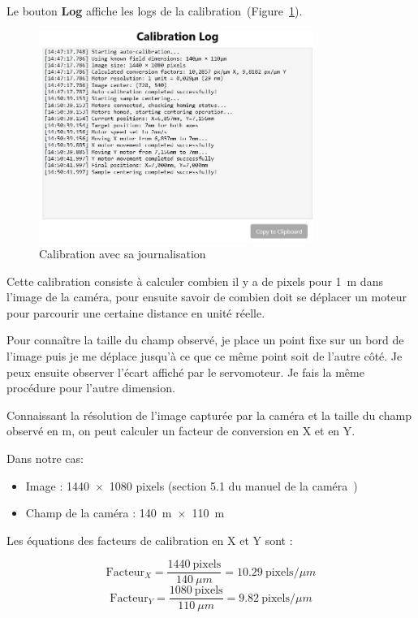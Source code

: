 Le bouton \textcolor[RGB]{102,125,138}{\textbf{Log}} affiche les logs de la calibration~(Figure~\ref{Calibration_Center_logs}).
\begin{figure}[H]
    \centering
    \includegraphics[width=0.8\textwidth]{assets/figures/Application_ServoVision/Calibration_Center_logs.jpeg}
    \caption{Calibration avec sa journalisation}
    \label{Calibration_Center_logs}
\end{figure}
Cette calibration consiste à calculer combien il y a de pixels pour 1~\textmu m dans l'image de la caméra, pour ensuite savoir de combien doit se déplacer un moteur pour parcourir une certaine distance en unité réelle.

Pour connaître la taille du champ observé, je place un point fixe sur un bord de l'image puis je me déplace jusqu'à ce que ce même point soit de l'autre côté. Je peux ensuite observer l'écart affiché par le servomoteur. Je fais la même procédure pour l'autre dimension.

Connaissant la résolution de l'image capturée par la caméra et la taille du champ observé en \textmu m, on peut calculer un facteur de conversion en X et en Y.

Dans notre cas:
\begin{itemize}
    \item Image : 1440~$\times$~1080 pixels (section 5.1 du manuel de la caméra~\cite{cameraCS165CU/M})
    \item Champ de la caméra : 140~\textmu m~$\times$~110~\textmu m
\end{itemize}

Les équations des facteurs de calibration en X et Y sont :

\[
    \text{Facteur}_X = \frac{1440\ \text{pixels}}{140\ \mu m} = 10.29\ \text{pixels}/\mu m
\]
\[
    \text{Facteur}_Y = \frac{1080\ \text{pixels}}{110\ \mu m} = 9.82\ \text{pixels}/\mu m
\]

